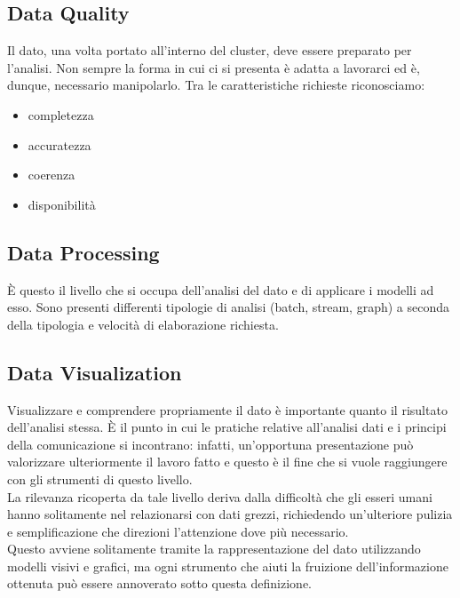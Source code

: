 \subsection{Data Quality}
Il dato, una volta portato all'interno del cluster, deve essere preparato per l'analisi. Non sempre la forma in cui ci si presenta è adatta a lavorarci ed è, dunque, necessario manipolarlo. Tra le caratteristiche richieste riconosciamo: 
\begin{itemize}
	\item completezza
	\item accuratezza
	\item coerenza
	\item disponibilità
\end{itemize}

\subsection{Data Processing}
È questo il livello che si occupa dell'analisi del dato e di applicare i modelli ad esso. Sono presenti differenti tipologie di analisi (batch, stream, graph) a seconda della tipologia e velocità di elaborazione richiesta.\\


\subsection{Data Visualization}
Visualizzare e comprendere propriamente il dato è importante quanto il risultato dell'analisi stessa. È il punto in cui le pratiche relative all'analisi dati e i principi della comunicazione si incontrano: infatti, un'opportuna presentazione può valorizzare ulteriormente il lavoro fatto e questo è il fine che si vuole raggiungere con gli strumenti di questo livello.\\
La rilevanza ricoperta da tale livello deriva dalla difficoltà che gli esseri umani hanno solitamente nel relazionarsi con dati grezzi, richiedendo un'ulteriore pulizia e semplificazione che direzioni l'attenzione dove più necessario.\\
Questo avviene solitamente tramite la rappresentazione del dato utilizzando modelli visivi e grafici, ma ogni strumento che aiuti la fruizione dell'informazione ottenuta può essere annoverato sotto questa definizione.